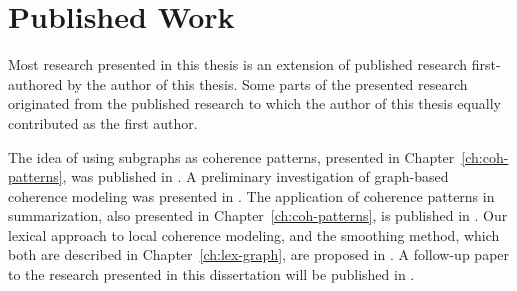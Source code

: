 \section{Published Work}
\label{sec:intro-published}

Most research presented in this thesis is an extension of published research first-authored by the author of this thesis. 
Some parts of the presented research originated from the published research to which the author of this thesis equally contributed as the first author. 

The idea of using subgraphs as coherence patterns, presented in Chapter~\ref{ch:coh-patterns}, was published in . 
A preliminary investigation of graph-based coherence modeling was presented in . 
The application of coherence patterns in summarization, also presented in Chapter~\ref{ch:coh-patterns}, is published in . 
Our lexical approach to local coherence modeling, and the smoothing method, which both are described in Chapter~\ref{ch:lex-graph}, are proposed in .
A follow-up paper to the research presented in this dissertation will be published in . 


